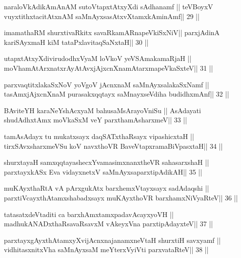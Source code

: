 \begin{shl}
naraloVkAdikAmAnAM sutoVtapxtAtxyXdi sAdhanamf ||
teVBoyxV vuyxtithxtacitAtxnAM saMnAyxsasAtxvXtamxkAminAmf\hfill || 29 ||
\end{shl}

\begin{shl}
imamathaRM shurxtivaRkitx savaRkamARnapeVkiSxNiV||
parxjAdinA kariSAyxmaH kiM tataPxlavitaqSaNxtaH\hfill || 30 ||
\end{shl}

\begin{shl}
utapxtAtxyXdivirudodhxV\s yaM loVkoV yeVSAmakamaRjaH ||
moVhamAtArxnatxrAyAtAvxjAjxcnXnamAtarxmapeVkaSxteV\hfill || 31 ||
\end{shl}

\begin{shl}
parxvaqtitxlakaSxNoV yoVgoV jAcnxnaM saMnAyxsalakaSxNamf ||
tasAmxjAjxcnXnaM purasakxqqtayx saMnayxseVdiha budidhxmAnf\hfill || 32 ||
\end{shl}

\begin{shl}
BAviteYH karaNeYshAcxyaM bahusaMsArayoVniSu ||
AsAdayati shudAdhxtAmx moVkaSxM veY parxthamAsharxmeV\hfill || 33 ||
\end{shl}

\begin{shl}
tamAsAdayx tu mukatxsayx daqSATxthaRsayx vipashicxtaH ||
tirxSAvxsharxmeVSu koV navxthoVR BaveVtapxramaBiVpasxtaH\hfill || 34 ||
\end{shl}

\begin{shl}
shurxtayaH samxqqtayashecxYvamasimxnanxtheVR sahasarxshaH ||
parxtayxkASx Eva vidayxnetxV saMnAyxsaparxtipAdikAH\hfill || 35 ||
\end{shl}

\begin{shl}
muKAyxthaRtA vA pArxgukAtx barxhemxVtayxsayx sadAdaqshi ||
parxtiVcayxthA\s\s tamxshabadxsayx muKAyxthoVR barxhamxNiVyaRteV\hfill || 36 ||
\end{shl}

\begin{shl}
tatasatxdeVtaditi ca barxhAmxtamxpadavAcayxyoVH ||
madhukANADxthaRsavaRsavxM vAkeyxVna parxtipAdayxteV\hfill || 37 ||
\end{shl}

\begin{shl}
parxtayxgAyxthAtamxyXvijAcnxnajanamxneV\s taH shurxtiH savxyamf ||
vidhitasxnitxVha saMnAyxsaM meYterxVyiVti parxvataRteV\hfill || 38 ||
\end{shl}

